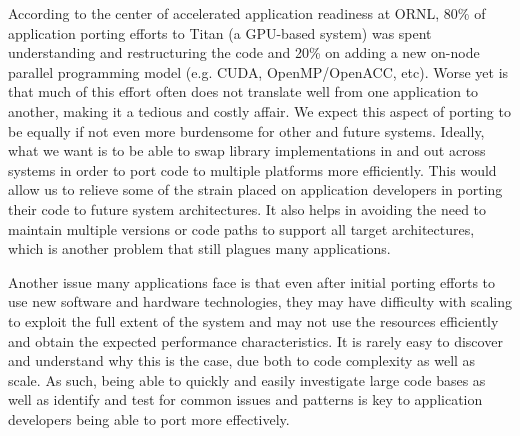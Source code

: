 According to the center of accelerated application readiness at ORNL, 80\% of application porting efforts to Titan (a \acs{GPU}-based system) was spent understanding and restructuring the code and 20\% on adding a new on-node parallel programming model (e.g. CUDA, OpenMP/OpenACC, etc).
Worse yet is that much of this effort often does not translate well from one application to another, making it a tedious and costly affair.
We expect this aspect of porting to be equally if not even more burdensome for other and future systems.
Ideally, what we want is to be able to swap library implementations in and out across systems in order to port code to multiple platforms more efficiently.
This would allow us to relieve some of the strain placed on application developers in porting their code to future system architectures.
It also helps in avoiding the need to maintain multiple versions or code paths to support all target architectures, which is another problem that still plagues many applications.

Another issue many applications face is that even after initial porting efforts to use new software and hardware technologies, they may have difficulty with scaling to exploit the full extent of the system and may not use the resources efficiently and obtain the expected performance characteristics.
It is rarely easy to discover and understand why this is the case, due both to code complexity as well as scale.
As such, being able to quickly and easily investigate large code bases as well as identify and test for common issues and patterns is key to application developers being able to port more effectively.





